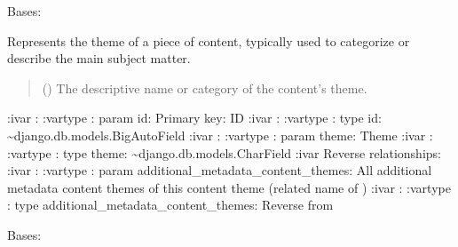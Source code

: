 \documentclass[letterpaper,10pt,english]{sphinxmanual}
\begin{document}
\begin{fulllineitems}
\label{\detokenize{source/meta_models_management:meta_models_management.models.ContentTheme}}
\pysigstartsignatures
{}
\pysigstopsignatures
\sphinxAtStartPar
Bases: 

\sphinxAtStartPar
Represents the theme of a piece of content, typically used to categorize or describe the main subject matter.
\begin{quote}\begin{description}
\sphinxAtStartPar
{} () \textendash{} The descriptive name or category of the content’s theme.

\end{description}\end{quote}

\sphinxAtStartPar
:ivar : 
:vartype : param id: Primary key: ID
:ivar : 
:vartype : type id: \textasciitilde{}django.db.models.BigAutoField
:ivar : 
:vartype : param theme: Theme
:ivar :
:vartype : type theme: \textasciitilde{}django.db.models.CharField
:ivar Reverse relationships:
:ivar : 
:vartype : param additional\_metadata\_content\_themes: All additional metadata content themes of this content theme (related name of )
:ivar : 
:vartype : type additional\_metadata\_content\_themes: Reverse  from {\hyperref[\detokenize{source/meta_models_management:meta_models_management.models.AdditionalMetadata}]{}}

\begin{fulllineitems}
\label{\detokenize{source/meta_models_management:meta_models_management.models.ContentTheme.DoesNotExist}}
\pysigstartsignatures
{}
\pysigstopsignatures
\sphinxAtStartPar
Bases: 


\end{fulllineitems}
\end{fulllineitems}
\end{document}
